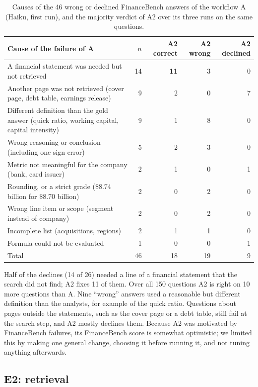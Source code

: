 \begin{table}[ht]
\centering\small
\begin{tabularx}{\linewidth}{Xrrrr}
\toprule
Cause of the failure of A & $n$ & A2 correct & A2 wrong & A2 declined \\
\midrule
A financial statement was needed but not retrieved & 14 & \textbf{11} & 3 & 0 \\
Another page was not retrieved (cover page, debt table, earnings release) & 9 & 2 & 0 & 7 \\
Different definition than the gold answer (quick ratio, working capital, capital intensity) & 9 & 1 & 8 & 0 \\
Wrong reasoning or conclusion (including one sign error) & 5 & 2 & 3 & 0 \\
Metric not meaningful for the company (bank, card issuer) & 2 & 1 & 0 & 1 \\
Rounding, or a strict grade (\$8.74 billion for \$8.70 billion) & 2 & 0 & 2 & 0 \\
Wrong line item or scope (segment instead of company) & 2 & 0 & 2 & 0 \\
Incomplete list (acquisitions, regions) & 2 & 1 & 1 & 0 \\
Formula could not be evaluated & 1 & 0 & 0 & 1 \\
\midrule
Total & 46 & 18 & 19 & 9 \\
\bottomrule
\end{tabularx}
\caption{Causes of the 46 wrong or declined FinanceBench answers of the workflow A (Haiku, first
run), and the majority verdict of A2 over its three runs on the same questions.}
\label{tab:fb-errors}
\end{table}

Half of the declines (14 of 26) needed a line of a financial statement that the search did not find;
A2 fixes 11 of them. Over all 150 questions A2 is right on 10 more questions than A. Nine ``wrong''
answers used a reasonable but different definition than the analysts, for example of the quick ratio.
Questions about pages outside the statements, such as the cover page or a debt table, still fail at
the search step, and A2 mostly declines them. Because A2 was motivated by FinanceBench failures, its
FinanceBench score is somewhat optimistic; we limited this by making one general change, choosing it
before running it, and not tuning anything afterwards.

\subsection{E2: retrieval}

